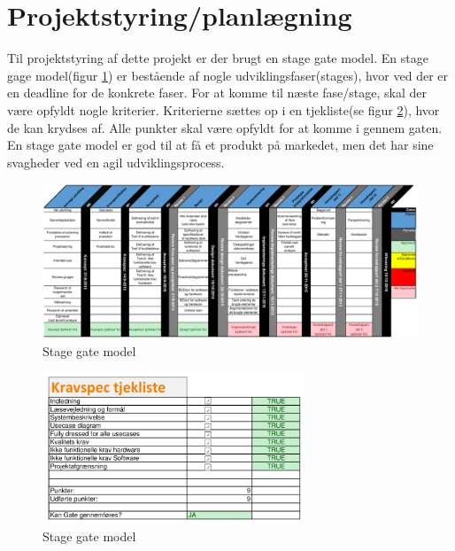 \section{Projektstyring/planlægning} 
Til projektstyring af dette projekt er der brugt en stage gate model. En stage gage model(figur \ref{fig:stage-gate}) er bestående af nogle udviklingsfaser(stages), hvor ved der er en deadline for de konkrete faser. For at komme til næste fase/stage, skal der være opfyldt nogle kriterier. Kriterierne sættes op i en tjekliste(se figur \ref{fig:stage-gate-tjekliste}), hvor de kan krydses af. Alle punkter skal være opfyldt for at komme i gennem gaten. En stage gate model er god til at få et produkt på markedet, men det har sine svagheder ved en agil udviklingsprocess. 
\begin{landscape}
\begin{figure}[H]
	\centering
	\includegraphics[width=1.6\textwidth]{billeder/Hovedrapport/Stage-gateP.PDF}
	\caption{Stage gate model}
	\label{fig:stage-gate}
\end{figure}
\end{landscape}

\begin{figure}[H]
	\centering
	\includegraphics[width=0.7\textwidth]{billeder/Hovedrapport/Stagegatetjekliste.PDF}
	\caption{Stage gate model}
	\label{fig:stage-gate-tjekliste}
\end{figure}

